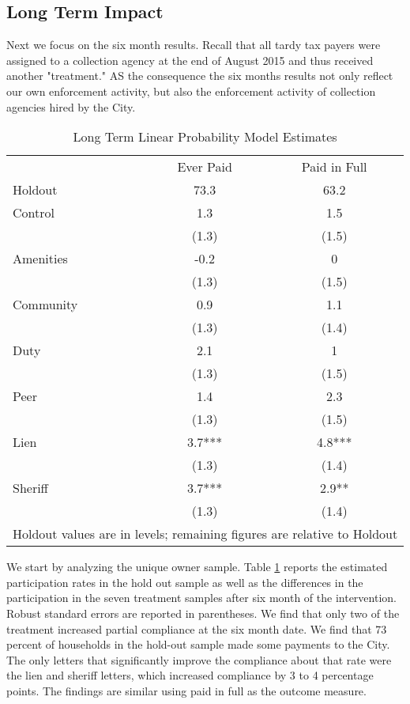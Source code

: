 \documentclass[12pt]{article}
\begin{document}
\newpage

\subsection{Long Term Impact}

Next we focus on the six month results. Recall that all tardy tax
payers were assigned to a collection agency at the end of August 2015
and thus received another "treatment." AS the consequence the six
months results not only reflect our own enforcement activity, but also
the enforcement activity of collection agencies hired by the City.


\begin{table}[htbp]
\caption{Long Term Linear Probability Model Estimates}\label{lg_pc_lin}
\bigskip
\centering
\begin{tabular}{l c c }
  \hline
   & Ever Paid & Paid in Full \\
Holdout & 73.3 & 63.2 \\ 
   \hline
Control & 1.3 & 1.5 \\ 
   & (1.3) & (1.5) \\ 
Amenities & -0.2 & 0 \\ 
   & (1.3) & (1.5) \\ 
Community & 0.9 & 1.1 \\ 
   & (1.3) & (1.4) \\ 
Duty & 2.1 & 1 \\ 
   & (1.3) & (1.5) \\ 
Peer & 1.4 & 2.3 \\ 
   & (1.3) & (1.5) \\ 
Lien & 3.7*** & 4.8*** \\ 
   & (1.3) & (1.4) \\ 
Sheriff & 3.7*** & 2.9** \\ 
   & (1.3) & (1.4) \\ 
    \hline 
 \multicolumn{3}{l}{\scriptsize{Holdout values are in levels; remaining
    figures are relative to Holdout}} \\
\end{tabular}
\end{table}


We start by analyzing the unique owner sample.  Table \ref{lg_pc_lin}
reports the estimated participation rates in the hold out sample as
well as the differences in the participation in the seven treatment
samples after six month of the intervention. Robust standard errors
are reported in parentheses. We find that only two of the treatment
increased partial compliance at the six month date.  We find that 73
percent of households in the hold-out sample made some payments to the
City. The only letters that significantly improve the compliance about
that rate were the lien and sheriff letters, which increased
compliance by 3 to 4 percentage points. The findings are similar using
paid in full as the outcome measure.
\end{document}

